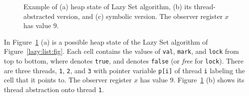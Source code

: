  

\begin{figure}[h]
\center
	
\caption{Example of (a) heap state of Lazy Set algorithm, (b) its thread-abstracted version, and (c) symbolic version.
  The observer register $x$ has value $9$.}
\label{fig:llshapes}
\end{figure}


In Figure~\ref{fig:llshapes} (a) is a possible heap state of the
Lazy Set algorithm of Figure~\ref{lazy:list:fig}.
Each cell contains the values of {\tt val}, {\tt mark}, and {\tt lock}
from top to bottom, where \tick denotes {\tt true}, and \cross denotes
{\tt false} (or {\it free} for {\tt lock}). There are three threads,
{\tt 1}, {\tt 2}, and {\tt 3} with
pointer variable {\tt p[i]} of thread {\tt i} labeling the cell that it points
to.   The observer register $x$ has value $9$.
Figure~\ref{fig:llshapes} (b) shows its thread abstraction onto thread {\tt 1}.

